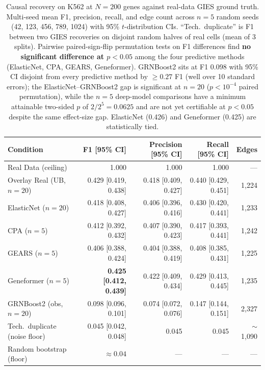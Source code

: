 \documentclass{article}
\theoremstyle{plain}
\theoremstyle{definition}
\theoremstyle{remark}
\begin{document}
\begin{table}[t]
\caption{Causal recovery on K562 at $N{=}200$ genes against real-data GIES ground truth. Multi-seed mean F1, precision, recall, and edge count across $n=5$ random seeds (42, 123, 456, 789, 1024) with 95\% $t$-distribution CIs. ``Tech.\ duplicate'' is F1 between two GIES recoveries on disjoint random halves of real cells (mean of 3 splits). Pairwise paired-sign-flip permutation tests on F1 differences find \textbf{no significant difference at $p<0.05$} among the four predictive methods (ElasticNet, CPA, GEARS, Geneformer). GRNBoost2 sits at F1 0.098 with 95\% CI disjoint from every predictive method by $\geq 0.27$ F1 (well over 10 standard errors); the ElasticNet--GRNBoost2 gap is significant at $n=20$ ($p<10^{-4}$ paired permutation), while the $n=5$ deep-model comparisons have a minimum attainable two-sided $p$ of $2/2^5 = 0.0625$ and are not yet certifiable at $p<0.05$ despite the same effect-size gap. ElasticNet (0.426) and Geneformer (0.425) are statistically tied.}
\label{tab:main}
\vskip 0.1in
\centering
\small
\begin{tabular}{lrrrr}
\toprule
\textbf{Condition} & \textbf{F1 [95\% CI]} & \textbf{Precision [95\% CI]} & \textbf{Recall [95\% CI]} & \textbf{Edges} \\
\midrule
Real Data (ceiling)   & 1.000                & 1.000                & 1.000                & --- \\
Overlay Real (UB, $n{=}20$) & 0.429 [0.419, 0.438] & 0.418 [0.409, 0.427] & 0.440 [0.429, 0.451] & 1{,}224 \\
ElasticNet ($n{=}20$) & 0.418 [0.408, 0.427] & 0.406 [0.396, 0.416] & 0.430 [0.420, 0.441] & 1{,}233 \\
CPA ($n{=}5$)         & 0.412 [0.392, 0.432] & 0.407 [0.390, 0.423] & 0.417 [0.393, 0.441] & 1{,}242 \\
GEARS ($n{=}5$)       & 0.406 [0.388, 0.424] & 0.404 [0.388, 0.419] & 0.408 [0.385, 0.431] & 1{,}225 \\
Geneformer ($n{=}5$)  & \textbf{0.425 [0.412, 0.439]} & 0.422 [0.409, 0.434] & 0.429 [0.413, 0.445] & 1{,}235 \\
GRNBoost2 (obs, $n{=}20$) & 0.098 [0.096, 0.101] & 0.074 [0.072, 0.076] & 0.147 [0.144, 0.151] & 2{,}327 \\
\midrule
Tech.\ duplicate (noise floor) & 0.045 [0.042, 0.048] & 0.045 & 0.045 & $\sim$1{,}090 \\
Random bootstrap (floor)       & $\approx 0.04$  & ---             & ---             & --- \\
\bottomrule
\end{tabular}
\vskip -0.1in
\end{table}
\end{document}
